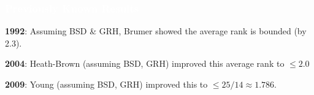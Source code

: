 \begin{frame}
\frametitle{\textcolor{white}{Previously Known Results}}

\textbf{1992}: Assuming BSD \& GRH, Brumer showed the average rank is bounded (by 2.3). \pause \vfill

\textbf{2004}: Heath-Brown (assuming BSD, GRH) improved this average rank to $\leq 2.0$ \pause  \vfill

\textbf{2009}: Young (assuming BSD, GRH) improved this to $\leq 25/14 \approx 1.786$. \vfill
\end{frame}



\begin{frame}[plain]
\end{frame}



